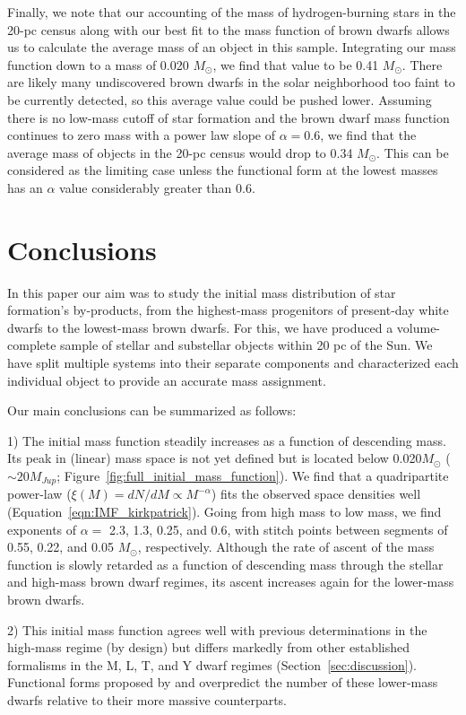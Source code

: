 \documentclass[twocolumn,tighten,twocolappendix]{aastex631}
\begin{document}
Finally, we note that our accounting of the mass of hydrogen-burning stars in the 20-pc census along with our best fit to the mass function of brown dwarfs allows us to calculate the average mass of an object in this sample. Integrating our mass function  down to a mass of 0.020 $M_\odot$, we find that value to be 0.41 $M_\odot$. There are likely many undiscovered brown dwarfs in the solar neighborhood too faint to be currently detected, so this average value could be pushed lower. Assuming there is no low-mass cutoff of star formation and the brown dwarf mass function continues to zero mass with a power law slope of $\alpha = 0.6$, we find that the average mass of objects in the 20-pc census would drop to 0.34 $M_\odot$. This can be considered as the limiting case unless the functional form at the lowest masses has an $\alpha$ value considerably greater than 0.6.


\section{Conclusions\label{sec:conclusions}}

In this paper our aim was to study the initial mass distribution of star formation's by-products, from the highest-mass progenitors of present-day white dwarfs to the lowest-mass brown dwarfs. For this, we have produced a volume-complete sample of stellar and substellar objects within 20 pc of the Sun. We have split multiple systems into their separate components and characterized each individual object to provide an accurate mass assignment.

Our main conclusions can be summarized as follows:

1) The initial mass function steadily increases as a function of descending mass. Its peak in (linear) mass space is not yet defined but is located below 0.020$M_\odot$ ($\sim20M_{Jup}$; Figure~\ref{fig:full_initial_mass_function}). We find that a quadripartite power-law ($\xi(M) = dN/dM \propto M^{-\alpha}$) fits the observed space densities well (Equation~\ref{eqn:IMF_kirkpatrick}). Going from high mass to low mass, we find exponents of $\alpha =$ 2.3, 1.3, 0.25, and 0.6, with stitch points between segments of 0.55, 0.22, and 0.05 $M_\odot$, respectively. Although the rate of ascent of the mass function is slowly retarded as a function of descending mass through the stellar and high-mass brown dwarf regimes, its ascent increases again for the lower-mass brown dwarfs.

2) This initial mass function agrees well with previous determinations in the high-mass regime (by design) but differs markedly from other established formalisms in the M, L, T, and Y dwarf regimes (Section~\ref{sec:discussion}). Functional forms proposed by \cite{chabrier2003b} and \cite{kroupa2013} overpredict the number of these lower-mass dwarfs relative to their more massive counterparts.
\end{document}
